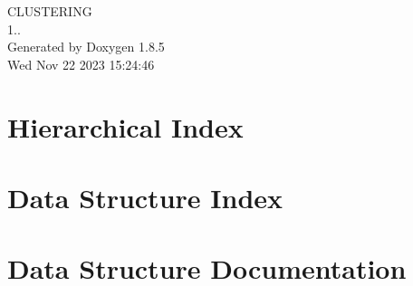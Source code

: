\documentclass[twoside]{book}
\newcommand{\clearemptydoublepage}{%
  \newpage{\pagestyle{empty}\cleardoublepage}%
}
\begin{document}
\begin{titlepage}
\vspace*{7cm}
\begin{center}%
{\Large C\-L\-U\-S\-T\-E\-R\-I\-N\-G \\[1ex]\large 1.. }\\
\vspace*{1cm}
{\large Generated by Doxygen 1.8.5}\\
\vspace*{0.5cm}
{\small Wed Nov 22 2023 15:24:46}\\
\end{center}
\end{titlepage}
\clearemptydoublepage
\tableofcontents
\clearemptydoublepage
{}

\chapter{Hierarchical Index}

\chapter{Data Structure Index}

\chapter{Data Structure Documentation}

































\newpage
{}
{}
\printindex
\end{document}
